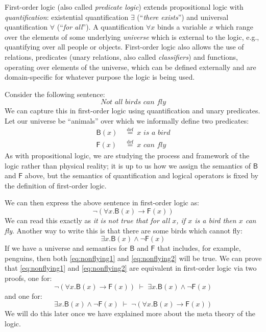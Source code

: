 \renewcommand{\highlight}[1]{%
  \colorbox{yellow!50}{$\displaystyle#1$}}
\newcommand{\highlightG}[1]{%
  \colorbox{green!30}{$\displaystyle#1$}}
\newcommand{\highlightR}[1]{%
  \colorbox{red!20}{$\displaystyle#1$}}

\newcommand{\rel}[1]{\mathsf{#1}}

First-order logic (also called \emph{predicate logic}) extends
propositional logic with \emph{quantification}: existential quantification
$\exists$ (``\emph{there exists}'') and universal quantification
$\forall$ (``\emph{for all}''). A quantification $\forall x$
binds a variable $x$ which range over the elements of some underlying
\emph{universe} which is external to the logic, e.g., quantifying
over all people or objects.  First-order logic also
allows the use of relations, predicates (unary relations, also called
\emph{classifiers}) and functions, operating
over elements of the universe, which can
be defined externally and are
domain-specific for whatever purpose the logic is being used.

Consider the following sentence:
%
\begin{equation*}
  \textit{Not all birds can fly}
\end{equation*}
%
We can capture this in first-order logic using quantification and
unary predicates. Let our universe be ``animals''
over which we informally define two predicates:
%
\begin{align*}
  \rel{B}(x)\ & \stackrel{\text{def}}{=}\ \textit{$x$ is a bird} \\
  \rel{F}(x)\ & \stackrel{\text{def}}{=}\ \textit{$x$ can fly}
\end{align*}
%
As with propositional logic, we are studying the process and framework
of the logic rather than physical reality; it is up to us how we
assign the semantics of $\rel{B}$ and $\rel{F}$ above, but the
semantics of quantification and logical operators is fixed by the
definition of first-order logic.

We can then express the above sentence in first-order logic as:
%
\begin{equation}
  \neg (\forall x . \rel{B}(x) \rightarrow \rel{F}(x))
  \label{eq:nonflying1}
\end{equation}
%
We can read this exactly as \emph{it is not true that for all $x$, if
  $x$ is a bird then $x$ can fly}. Another way to write this is
that there are some birds which cannot fly:
%
\begin{equation}
  \exists x . \rel{B}(x) \wedge \neg \rel{F}(x)
    \label{eq:nonflying2}
\end{equation}
%
If we have a universe and semantics for $\rel{B}$ and $\rel{F}$ that includes, for
example, penguins, then both \eqref{eq:nonflying1} and
\eqref{eq:nonflying2} will be true.
We can prove that \eqref{eq:nonflying1} and
\eqref{eq:nonflying2} are equivalent in first-order logic via two
proofs, one for:
$$\neg (\forall x . \rel{B}(x) \rightarrow \rel{F}(x)) \; \vdash \;
\exists x . \rel{B}(x) \wedge \neg \rel{F}(x)$$
and one for:
$$
\exists x . \rel{B}(x) \wedge \neg \rel{F}(x) \; \vdash \;
\neg (\forall x . \rel{B}(x) \rightarrow \rel{F}(x))
$$
We will do this later once we have explained more about the
meta theory of the logic.

